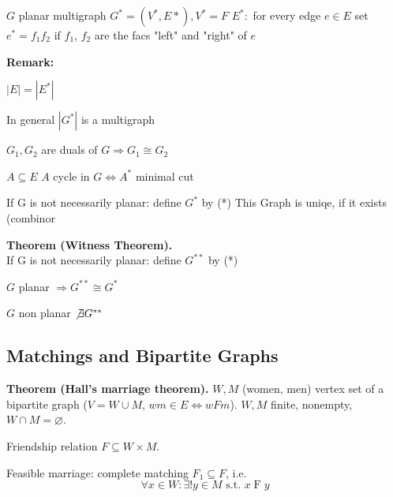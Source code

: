 

\def \GammaPlus {\Gamma^{+}}


$G$ planar multigraph
$G^*= (V^*, E*), V^*= F$
$E^*: $ for every edge $e \in E$ set $e^* = f_1 f_2$ if $f_1$, $f_2$ are the facs "left" and "right" of $e$


\textbf{Remark:}
\begin{compactenum}
  \item $|E| = |E^*|$
  \item In general $|G^*|$ is a multigraph
  \item $G_1, G_2$ are duals of $G \Rightarrow G_1 \cong G_2$
\end{compactenum}

$A \subseteq E$    
$A$ cycle in $G \iff A^*$ minimal cut

If G is not necessarily planar: define $G^*$ by (*)
This Graph is uniqe, if it exists (combinor

\textbf{Theorem (Witness Theorem).} \\
If G is not necessarily planar: define $G^{**}$ by (*)
\begin{compactitem}
  \item $G$ planar $\Rightarrow G^{**} \cong G^*$
  \item $G$ non planar $\not\exists G^{**}$
\end{compactitem}


\subsection*{Matchings and Bipartite Graphs}

\strut{}
\textbf{Theorem (Hall's marriage theorem).}
$W, M$ (women, men) vertex set of a bipartite graph
($V=W\cup M$, $wm \in E \iff wFm$). $W,M$ finite, nonempty, $W\cap M=\varnothing$.

Friendship relation $F\subseteq W\times M$.

Feasible marriage: complete matching $F_1\subseteq F$, i.e.
\[ \forall x\in W: \exists! y\in M\text{ s.t. }x\operatorname{F} y \]


